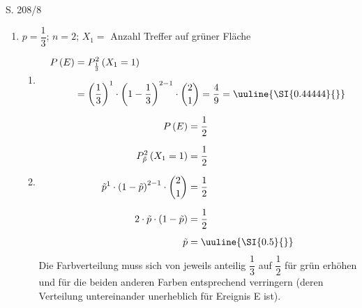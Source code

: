 \begin{Exercise}{S. 208/8}{}
\begin{enumerate}[leftmargin=*]
    \item [8.]{
        $p = \dfrac{1}{3}$; \quad $n = 2$; \quad $X_{1} =$ Anzahl Treffer auf grüner Fläche\\[-1.0ex]
        \begin{enumerate}[label=\alph*),leftmargin=*]
            \item[a)] {
                \vspace{-2.0ex}
                \begin{align*}
                    P\left(E\right) &= P_{\frac{1}{3}}^{2}\left(X_{1} = 1\right)\\[1.5ex]
                    &= \left(\dfrac{1}{3}\right)^{1} \cdot \left(1 - \dfrac{1}{3}\right)^{2-1} \cdot \binom{2}{1} = \dfrac{4}{9} = \uuline{\SI{0.44444}{}}
                \end{align*}
                }
            \item[b)] {
                \vspace{-2.0ex}
                \begin{align*}
                    P\left(E\right) &= \dfrac{1}{2}\\[1.5ex]
                    P_{\tilde{p}}^{2}\left(X_{1} = 1\right) &= \dfrac{1}{2}\\[1.5ex]
                    \tilde{p}^{1} \cdot \left(1 - \tilde{p}\right)^{2-1} \cdot \binom{2}{1} &= \dfrac{1}{2}\\[1.5ex]
                    2 \cdot \tilde{p} \cdot \left(1 - \tilde{p}\right) &= \dfrac{1}{2}\\[1.0ex]
                    \tilde{p} &= \uuline{\SI{0.5}{}}
                \end{align*}
                Die Farbverteilung muss sich von jeweils anteilig $\dfrac{1}{3}$ auf $\dfrac{1}{2}$ für grün erhöhen und für die beiden anderen Farben entsprechend verringern (deren Verteilung untereinander unerheblich für Ereignis E ist). 
                }
        \end{enumerate}
    }
\end{enumerate}
\end{Exercise}


